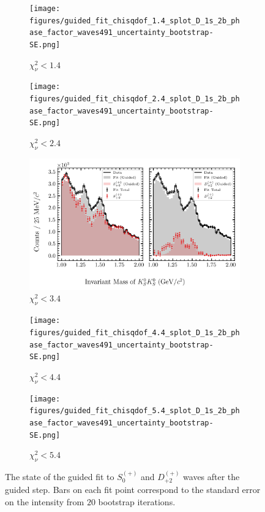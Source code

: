 \begin{figure}[htbp]
    \centering
    \begin{subfigure}{0.45\textwidth}
        \texttt{[image: figures/guided\_fit\_chisqdof\_1.4\_splot\_D\_1s\_2b\_phase\_factor\_waves491\_uncertainty\_bootstrap-SE.png]}
        \caption{$\chi^2_\nu < 1.4$}
    \end{subfigure}
    \hfill
    \begin{subfigure}{0.45\textwidth}
        \texttt{[image: figures/guided\_fit\_chisqdof\_2.4\_splot\_D\_1s\_2b\_phase\_factor\_waves491\_uncertainty\_bootstrap-SE.png]}
        \caption{$\chi^2_\nu < 2.4$}
    \end{subfigure}

    \vspace{1em}

    \begin{subfigure}{0.8\textwidth}
        \includegraphics[width=\linewidth]{figures/guided_fit_chisqdof_3.4_splot_D_1s_2b_phase_factor_waves491_uncertainty_bootstrap-SE.png}
        \caption{$\chi^2_\nu < 3.4$}
    \end{subfigure}

    \vspace{1em}

    \begin{subfigure}{0.45\textwidth}
        \texttt{[image: figures/guided\_fit\_chisqdof\_4.4\_splot\_D\_1s\_2b\_phase\_factor\_waves491\_uncertainty\_bootstrap-SE.png]}
        \caption{$\chi^2_\nu < 4.4$}
    \end{subfigure}
    \hfill
    \begin{subfigure}{0.45\textwidth}
        \texttt{[image: figures/guided\_fit\_chisqdof\_5.4\_splot\_D\_1s\_2b\_phase\_factor\_waves491\_uncertainty\_bootstrap-SE.png]}
        \caption{$\chi^2_\nu < 5.4$}
    \end{subfigure}

    \caption{The state of the guided fit to $S_{0}^{(+)}$ and $D_{+2}^{(+)}$ waves after the guided step. Bars on each fit point correspond to the standard error on the intensity from $20$ bootstrap iterations.}
    \label{fig:guided-fit-all-Sp-D2p}
\end{figure}

